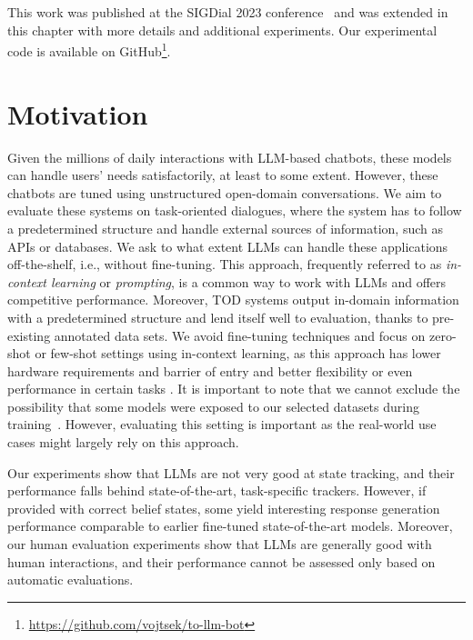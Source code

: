 This work was published at the SIGDial 2023 conference~\cite{hudecek-dusek-2023-large} and was extended in this chapter with more details and additional experiments.
Our experimental code is available on GitHub\footnote{\url{https://github.com/vojtsek/to-llm-bot}}.

\section{Motivation}
Given the millions of daily interactions with LLM-based chatbots, these models can handle users' needs satisfactorily, at least to some extent.
However, these chatbots are tuned using unstructured open-domain conversations.
We aim to evaluate these systems on task-oriented dialogues, where the system has to follow a predetermined structure and handle external sources of information, such as APIs or databases.
We ask to what extent LLMs can handle these applications off-the-shelf, i.e., without fine-tuning.
This approach, frequently referred to as \emph{in-context learning} or \emph{prompting}, is a common way to work with LLMs and offers competitive performance.
Moreover, TOD systems output in-domain information with a predetermined structure and lend itself well to evaluation, thanks to pre-existing annotated data sets.
We avoid fine-tuning techniques and focus on zero-shot or few-shot settings using in-context learning, as this approach has lower hardware requirements and barrier of entry and better flexibility or even performance in certain tasks \cite{su2022selective}.
It is important to note that we cannot exclude the possibility that some models were exposed to our selected datasets during training~\citep{golchin2023time}.
However, evaluating this setting is important as the real-world use cases might largely rely on this approach.


Our experiments show that LLMs are not very good at state tracking, and their performance falls behind state-of-the-art, task-specific trackers.
However, if provided with correct belief states, some yield interesting response generation performance comparable to earlier fine-tuned state-of-the-art models.
Moreover, our human evaluation experiments show that LLMs are generally good with human interactions, and their performance cannot be assessed only based on automatic evaluations.

